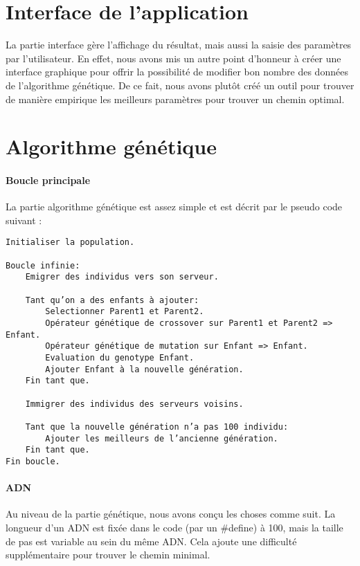 \documentclass[a4paper]{article}
\begin{document}
\newpage

\section*{Interface de l'application}
La partie interface gère l’affichage du résultat, mais aussi la saisie des paramètres par l’utilisateur. En effet, nous avons mis un autre point d'honneur à créer une interface graphique pour offrir la possibilité de modifier bon nombre des données de l’algorithme génétique. De ce fait, nous avons plutôt créé un outil pour trouver de manière empirique les meilleurs paramètres pour trouver un chemin optimal. \\


\section*{Algorithme génétique}

\paragraph{Boucle principale \\}
La partie algorithme génétique est assez simple et est décrit par le pseudo code suivant :
\begin{verbatim}
Initialiser la population.

Boucle infinie:
    Emigrer des individus vers son serveur.

    Tant qu’on a des enfants à ajouter:
        Selectionner Parent1 et Parent2.
        Opérateur génétique de crossover sur Parent1 et Parent2 => Enfant.
        Opérateur génétique de mutation sur Enfant => Enfant.
        Evaluation du genotype Enfant.
        Ajouter Enfant à la nouvelle génération.
    Fin tant que.

    Immigrer des individus des serveurs voisins.

    Tant que la nouvelle génération n’a pas 100 individu:
        Ajouter les meilleurs de l’ancienne génération.
    Fin tant que.
Fin boucle.
\end{verbatim}

\paragraph{ADN \\}
Au niveau de la partie génétique, nous avons conçu les choses comme suit. La longueur d’un ADN est fixée dans le code (par un \#define) à 100, mais la taille de pas est variable au sein du même ADN. Cela ajoute une difficulté supplémentaire pour trouver le chemin minimal. \\
\end{document}
